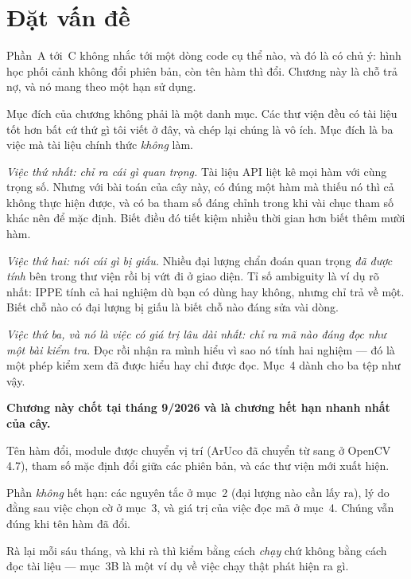 \documentclass[../../marker.tex]{subfiles}
\begin{document}
\section{Đặt vấn đề}

Phần~A tới~C không nhắc tới một dòng code cụ thể nào, và đó là có chủ ý: hình học phối cảnh không đổi phiên bản, còn tên hàm thì đổi. Chương này là chỗ trả nợ, và nó mang theo một hạn sử dụng.

Mục đích của chương không phải là một danh mục. Các thư viện đều có tài liệu tốt hơn bất cứ thứ gì tôi viết ở đây, và chép lại chúng là vô ích. Mục đích là ba việc mà tài liệu chính thức \emph{không} làm.

\emph{Việc thứ nhất: chỉ ra cái gì quan trọng.} Tài liệu API liệt kê mọi hàm với cùng trọng số. Nhưng với bài toán của cây này, có đúng một hàm mà thiếu nó thì cả  không thực hiện được, và có ba tham số đáng chỉnh trong khi vài chục tham số khác nên để mặc định. Biết điều đó tiết kiệm nhiều thời gian hơn biết thêm mười hàm.

\emph{Việc thứ hai: nói cái gì bị giấu.} Nhiều đại lượng chẩn đoán quan trọng \emph{đã được tính} bên trong thư viện rồi bị vứt đi ở giao diện. Tỉ số ambiguity là ví dụ rõ nhất: IPPE tính cả hai nghiệm dù bạn có dùng hay không, nhưng  chỉ trả về một. Biết chỗ nào có đại lượng bị giấu là biết chỗ nào đáng sửa vài dòng.

\emph{Việc thứ ba, và nó là việc có giá trị lâu dài nhất: chỉ ra mã nào đáng đọc như một bài kiểm tra.} Đọc  rồi nhận ra mình hiểu vì sao nó tính hai nghiệm --- đó là một phép kiểm xem  đã được hiểu hay chỉ được đọc. Mục~4 dành cho ba tệp như vậy.

\begin{cambay}
\textbf{Chương này chốt tại tháng 9/2026 và là chương hết hạn nhanh nhất của cây.}

Tên hàm đổi, module được chuyển vị trí (ArUco đã chuyển từ  sang  ở OpenCV 4.7), tham số mặc định đổi giữa các phiên bản, và các thư viện mới xuất hiện.

Phần \emph{không} hết hạn: các nguyên tắc ở mục~2 (đại lượng nào cần lấy ra), lý do đằng sau việc chọn cờ ở mục~3, và giá trị của việc đọc mã ở mục~4. Chúng vẫn đúng khi tên hàm đã đổi.

Rà lại mỗi sáu tháng, và khi rà thì kiểm bằng cách \emph{chạy} chứ không bằng cách đọc tài liệu --- mục~3B là một ví dụ về việc chạy thật phát hiện ra gì.
\end{cambay}
\end{document}
